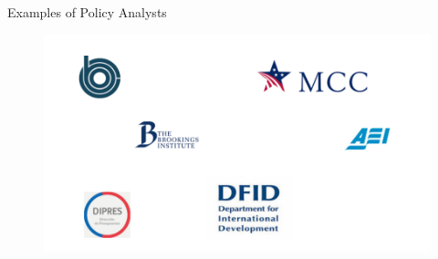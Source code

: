 \documentclass{beamer}
\begin{document}
\begin{frame}{Examples of Policy Analysts}
\begin{figure}[h!]
\vspace{-0.2in}
\centering
\hspace*{-3em}
\includegraphics[scale = 0.4]{../Images/policy_agencies}
\label{ex_pa}
\end{figure}	
\end{frame}
\end{document}
